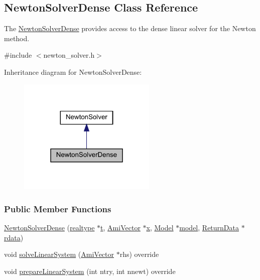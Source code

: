 \hypertarget{classamici_1_1_newton_solver_dense}{}\subsection{Newton\+Solver\+Dense Class Reference}
\label{classamici_1_1_newton_solver_dense}


The \mbox{\hyperlink{classamici_1_1_newton_solver_dense}{Newton\+Solver\+Dense}} provides access to the dense linear solver for the Newton method.  




{\ttfamily \#include $<$newton\+\_\+solver.\+h$>$}



Inheritance diagram for Newton\+Solver\+Dense\+:
\nopagebreak
\begin{figure}[H]
\begin{center}
\leavevmode
\includegraphics[width=187pt]{classamici_1_1_newton_solver_dense__inherit__graph}
\end{center}
\end{figure}
\subsubsection*{Public Member Functions}
\begin{DoxyCompactItemize}
\item 
\mbox{\hyperlink{classamici_1_1_newton_solver_dense_ad5a38fed10e08e345dfefe89569eb8ad}{Newton\+Solver\+Dense}} (\mbox{\hyperlink{namespaceamici_a1bdce28051d6a53868f7ccbf5f2c14a3}{realtype}} $\ast$\mbox{\hyperlink{classamici_1_1_newton_solver_ad94d61da9b85c1a151ffd8e228758c7c}{t}}, \mbox{\hyperlink{classamici_1_1_ami_vector}{Ami\+Vector}} $\ast$\mbox{\hyperlink{classamici_1_1_newton_solver_af64268982dd7b9be1690573763982e0b}{x}}, \mbox{\hyperlink{classamici_1_1_model}{Model}} $\ast$\mbox{\hyperlink{classamici_1_1_newton_solver_a7b56c3ca57dde73bdbc8dbe9772bca19}{model}}, \mbox{\hyperlink{classamici_1_1_return_data}{Return\+Data}} $\ast$\mbox{\hyperlink{classamici_1_1_newton_solver_a4c0807651f0594a186e8856f22e442cc}{rdata}})
\item 
void \mbox{\hyperlink{classamici_1_1_newton_solver_dense_aa4a6695d71f00ec1b46e94b33e55660f}{solve\+Linear\+System}} (\mbox{\hyperlink{classamici_1_1_ami_vector}{Ami\+Vector}} $\ast$rhs) override
\item 
void \mbox{\hyperlink{classamici_1_1_newton_solver_dense_a0b900656d018299b08d0f027e95bd347}{prepare\+Linear\+System}} (int ntry, int nnewt) override
\end{DoxyCompactItemize}
